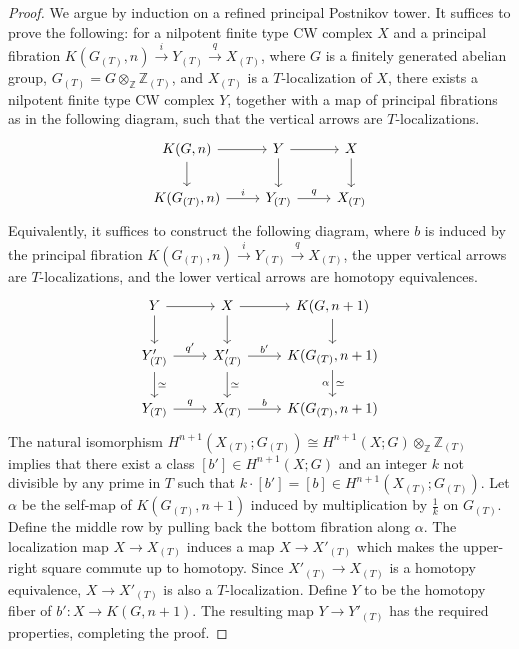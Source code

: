\documentclass[11pt]{amsart}
\theoremstyle{definition}
\numberwithin{equation}{section}
\numberwithin{equation}{section}
\newcommand\ZZ{\mathbb{Z}}
\begin{document}
\begin{proof}
We argue by induction on a refined principal Postnikov tower. It suffices to prove the following: for a nilpotent finite type CW complex $X$ and a principal fibration $K(G_{(T)},n)\xrightarrow{i} Y_{(T)}\xrightarrow{q} X_{(T)}$, where $G$ is a finitely generated abelian group, $G_{(T)}=G\otimes_{\ZZ}\ZZ_{(T)}$, and $X_{(T)}$  is a $T$-localization of $X$, there exists a nilpotent finite type CW complex $Y$, together with a map of principal fibrations as in the following diagram, such that the vertical arrows are $T$-localizations.
\[
\begin{tikzcd}
    K(G,n) \arrow[r] \arrow[d] & Y \arrow[r] \arrow[d] & X \arrow[d] \\
    K(G_{(T)},n) \arrow[r,"i"] & Y_{(T)} \arrow[r,"q"] & X_{(T)}
\end{tikzcd}
\]
Equivalently, it suffices to construct the following diagram, where $b$ is induced by the principal fibration $K(G_{(T)},n)\xrightarrow{i} Y_{(T)}\xrightarrow{q} X_{(T)}$, the upper vertical arrows are $T$-localizations, and the lower vertical arrows are homotopy equivalences.
\[
\begin{tikzcd}
    Y \arrow[r] \arrow[d] & X \arrow[r] \arrow[d] & K(G,n+1) \arrow[d] \\
     Y'_{(T)} \arrow[r,"q'"] \arrow[d,"\simeq"] & X'_{(T)} \arrow[r,"b'"] \arrow[d,"\simeq"] & K(G_{(T)},n+1) \arrow[d,"\simeq","\alpha"'] \\
     Y_{(T)} \arrow[r,"q"] & X_{(T)} \arrow[r,"b"]  & K(G_{(T)},n+1) 
\end{tikzcd}
\]
The natural isomorphism $H^{n+1}(X_{(T)};G_{(T)})\cong H^{n+1}(X;G)\otimes_{\ZZ} \ZZ_{(T)}$ implies that there exist a class $[b']\in H^{n+1}(X;G)$ and an integer $k$ not divisible by any prime in $T$ such that $k\cdot [b']=[b]\in H^{n+1}(X_{(T)};G_{(T)})$. Let $\alpha$ be the self-map of $K(G_{(T)},n+1)$ induced by multiplication by $\frac{1}{k}$ on $ G_{(T)}$. Define the middle row by pulling back the bottom fibration along $\alpha$. The localization map $X\rightarrow X_{(T)}$ induces a map $X\rightarrow X'_{(T)}$ which makes the upper-right square commute up to homotopy. Since $X'_{(T)}\rightarrow X_{(T)}$ is a homotopy equivalence, $X\rightarrow X'_{(T)}$ is also a $T$-localization. Define $Y$ to be the homotopy fiber of $b':X\rightarrow K(G,n+1)$. The resulting map $Y\rightarrow Y'_{(T)}$ has the required properties, completing the proof.
\end{proof}
\end{document}
